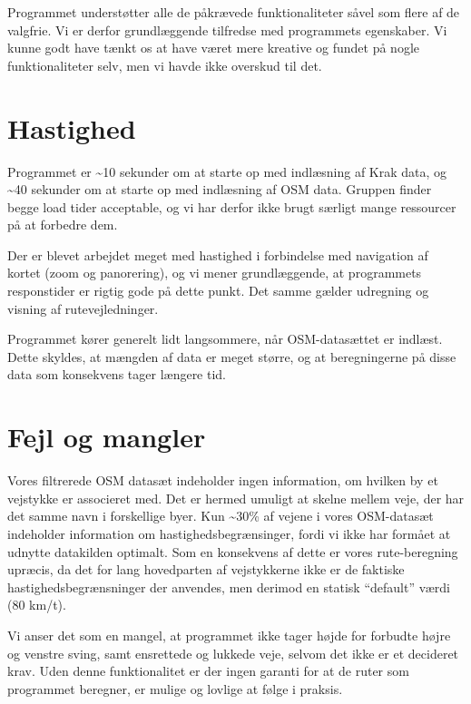 Programmet understøtter alle de påkrævede funktionaliteter såvel som flere af de valgfrie. Vi er derfor grundlæggende tilfredse med programmets egenskaber. Vi kunne godt have tænkt os at have været mere kreative og fundet på nogle funktionaliteter selv, men vi havde ikke overskud til det.

\section{Hastighed}
\label{sec:hastighed}

Programmet er \textasciitilde10 sekunder om at starte op med indlæsning af Krak data, og \textasciitilde40 sekunder om at starte op med indlæsning af OSM data. Gruppen finder begge load tider acceptable, og vi har derfor ikke brugt særligt mange ressourcer på at forbedre dem.

Der er blevet arbejdet meget med hastighed i forbindelse med navigation af kortet (zoom og panorering), og vi mener grundlæggende, at programmets responstider er rigtig gode på dette punkt. Det samme gælder udregning og visning af rutevejledninger.

Programmet kører generelt lidt langsommere, når OSM-datasættet er indlæst. Dette skyldes, at mængden af data er meget større, og at beregningerne på disse data som konsekvens tager længere tid.

\section{Fejl og mangler}
\label{sec:fejlOgMangler}

Vores filtrerede OSM datasæt indeholder ingen information, om hvilken by et vejstykke er associeret med. Det er hermed umuligt at skelne mellem veje, der har det samme navn i forskellige byer. Kun \textasciitilde30\% af vejene i vores OSM-datasæt indeholder information om hastighedsbegrænsinger, fordi vi ikke har formået at udnytte datakilden optimalt. Som en konsekvens af dette er vores rute-beregning upræcis, da det for lang hovedparten af vejstykkerne ikke er de faktiske hastighedsbegrænsninger der anvendes, men derimod en statisk ``default'' værdi (80 km/t).

Vi anser det som en mangel, at programmet ikke tager højde for forbudte højre og venstre sving, samt ensrettede og lukkede veje, selvom det ikke er et decideret krav. Uden denne funktionalitet er der ingen garanti for at de ruter som programmet beregner, er mulige og lovlige at følge i praksis.


